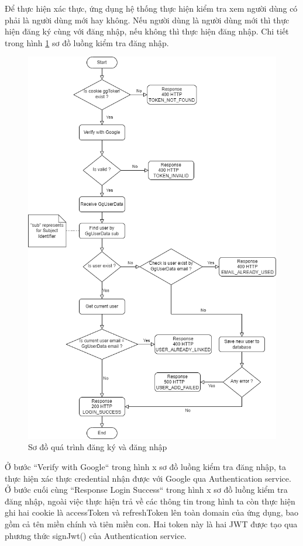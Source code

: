 Để thực hiện xác thực, ứng dụng hệ thống thực hiện kiểm tra xem người dùng có phải là người dùng mới hay không.
Nếu người dùng là người dùng mới thì thực hiện đăng ký cùng với đăng nhập, nếu không thì thực hiện đăng nhập.
Chi tiết trong hình \ref{fig:SignUpIn} sơ đồ luồng kiểm tra đăng nhập.

\begin{figure}[H]
  \centering
  \includegraphics[width=\textwidth]{applied-thesis-chapters/chapter-4/Sơ đồ quá trình đăng ký và đăng nhập.png}
  \caption{Sơ đồ quá trình đăng ký và đăng nhập}
  \label{fig:SignUpIn}
\end{figure}

Ở bước “Verify with Google“ trong hình x sơ đồ luồng kiểm tra đăng nhập, ta thực hiện xác thực credential nhận được với Google qua Authentication service. Ở bước cuối cùng “Response Login Success“ trong hình x sơ đồ luồng kiểm tra đăng nhập, ngoài việc thực hiện trả về các thông tin trong hình ta còn thực hiện ghi hai cookie là accessToken và refreshToken lên toàn domain của ứng dụng, bao gồm cả tên miền chính và tiên miền con. Hai token này là hai JWT được tạo qua phương thức signJwt() của Authentication service.

